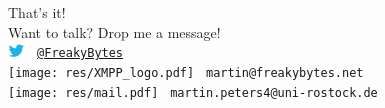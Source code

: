  
\begin{frame}{}{\mylogo}
	{\LARGE That's it!}\\[1.05em]
	{\Large Want to talk? Drop me a message!}
	\\[1.4em]
	
	\includegraphics[height=1em]{res/twitter.png}
	\textcolor{colorscheme}{\tt\  \href{https://twitter.com/FreakyBytes}{@FreakyBytes}}\\
	
	\texttt{[image: res/XMPP\_logo.pdf]}
	\textcolor{colorscheme}{\tt\  martin@freakybytes.net}\\
	
	\texttt{[image: res/mail.pdf]}
	\textcolor{colorscheme}{\tt\  martin.peters4@uni-rostock.de} 
	
	
\end{frame}